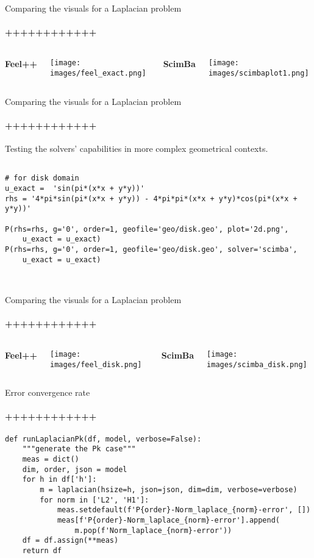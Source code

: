 \documentclass{beamer}
\begin{document}
\begin{frame}[fragile]{Comparing the visuals for a Laplacian problem}
\framesubtitle{++++++++++++}


\begin{columns}
\centering
\parbox{0.97\textwidth}{\centering \textbf{Feel++}}
\texttt{[image: images/feel\_exact.png]}
\centering
\parbox{0.97\textwidth}{\centering \textbf{ScimBa}}
\texttt{[image: images/scimbaplot1.png]}
\end{columns}
\end{frame}


\begin{frame}[fragile]{Comparing the visuals for a Laplacian problem}
\framesubtitle{++++++++++++}

Testing the solvers' capabilities in more complex geometrical contexts.

\begin{lstlisting}

# for disk domain
u_exact =  'sin(pi*(x*x + y*y))'
rhs = '4*pi*sin(pi*(x*x + y*y)) - 4*pi*pi*(x*x + y*y)*cos(pi*(x*x + y*y))'

P(rhs=rhs, g='0', order=1, geofile='geo/disk.geo', plot='2d.png', 
    u_exact = u_exact)
P(rhs=rhs, g='0', order=1, geofile='geo/disk.geo', solver='scimba', 
    u_exact = u_exact)

    
\end{lstlisting}
\end{frame}

\begin{frame}[fragile]{Comparing the visuals for a Laplacian problem}
\framesubtitle{++++++++++++}

\begin{columns}
\centering
\parbox{0.97\textwidth}{\centering \textbf{Feel++}}
\texttt{[image: images/feel\_disk.png]}
\centering
\parbox{0.97\textwidth}{\centering \textbf{ScimBa}}
\texttt{[image: images/scimba\_disk.png]}
\end{columns}
\end{frame}


\begin{frame}[fragile]{Error convergence rate}
\framesubtitle{++++++++++++}

\begin{lstlisting}
def runLaplacianPk(df, model, verbose=False):
    """generate the Pk case"""
    meas = dict()
    dim, order, json = model
    for h in df['h']:
        m = laplacian(hsize=h, json=json, dim=dim, verbose=verbose)
        for norm in ['L2', 'H1']:
            meas.setdefault(f'P{order}-Norm_laplace_{norm}-error', [])
            meas[f'P{order}-Norm_laplace_{norm}-error'].append(
                m.pop(f'Norm_laplace_{norm}-error'))
    df = df.assign(**meas)
    return df
\end{lstlisting}
\end{frame}
\end{document}
